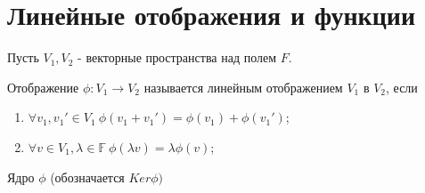 \section{Линейные отображения и функции}
    Пусть $V_1, V_2$ - векторные пространства над полем $F$.
    \begin{definition}
        Отображение $\phi: V_1 \rightarrow V_2$ называется линейным отображением $V_1$ в $V_2$, если
        \begin{enumerate}
            \item $\forall v_1, v_1'\in V_1 \ \phi(v_1 + v_1') = \phi(v_1) + \phi(v_1')$;
            \item $\forall v \in V_1, \lambda \in \mathbb{F} \ \phi(\lambda v) = \lambda\phi(v)$;
        \end{enumerate}
        Ядро $\phi$ (обозначается $Ker\phi)$
    \end{definition}